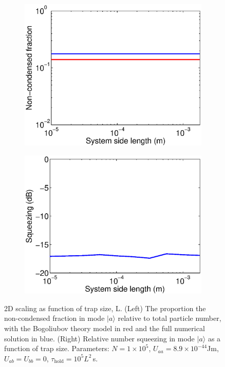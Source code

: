 \documentclass{iopart}
\begin{document}
\begin{figure}
  \centering
  \begin{subfigure}{.48\textwidth}
    \centering
    \includegraphics[width=\textwidth]{figures/2D_Bog_mode_occupation_scaling.eps}
  \end{subfigure}
  \begin{subfigure}{.48\textwidth}
    \centering
    \includegraphics[width=\textwidth]{figures/2D_squeezing_scaling.eps}
  \end{subfigure}
\caption{2D scaling as function of trap size, L. (Left) The proportion the non-condensed fraction in mode $|a\rangle$ relative to total particle number, with the Bogoliubov theory model in red and the full numerical solution in blue. (Right) Relative number squeezing in mode $|a\rangle$ as a function of trap size. Parameters: $N=1\times 10^5$, $U_{aa} = 8.9\times 10^{-44}$Jm, $U_{ab}=U_{bb}=0$, $\tau_{\mathrm{hold}} = 10^{5} L^2$\,s.}
  \label{fig2D_squeezing_and_bog_scaling}
\end{figure}
\end{document}
